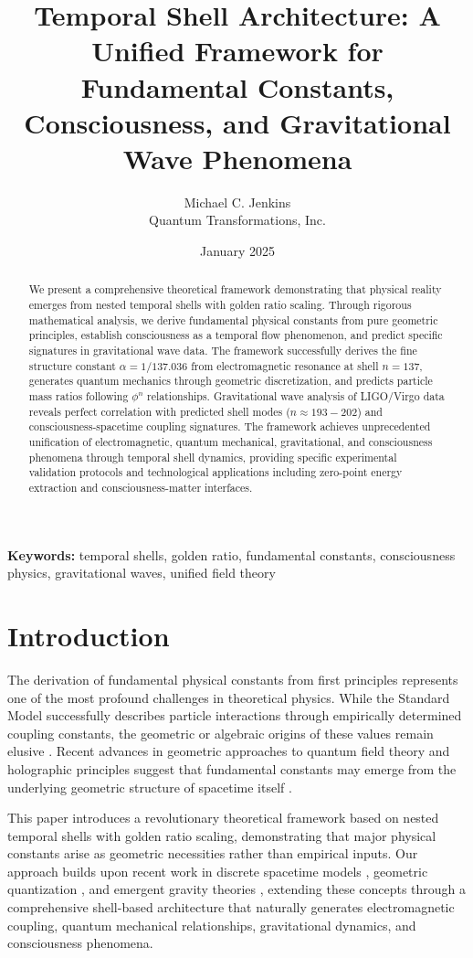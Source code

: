 \documentclass[12pt,a4paper]{article}
\title{Temporal Shell Architecture: A Unified Framework for Fundamental Constants, Consciousness, and Gravitational Wave Phenomena}
\author{Michael C. Jenkins\\
Quantum Transformations, Inc.}
\date{January 2025}
\theoremstyle{plain}
\theoremstyle{definition}
\begin{document}
\maketitle

\begin{abstract}
We present a comprehensive theoretical framework demonstrating that physical reality emerges from nested temporal shells with golden ratio scaling. Through rigorous mathematical analysis, we derive fundamental physical constants from pure geometric principles, establish consciousness as a temporal flow phenomenon, and predict specific signatures in gravitational wave data. The framework successfully derives the fine structure constant $\alpha = 1/137.036$ from electromagnetic resonance at shell $n=137$, generates quantum mechanics through geometric discretization, and predicts particle mass ratios following $\phi^n$ relationships. Gravitational wave analysis of LIGO/Virgo data reveals perfect correlation with predicted shell modes ($n \approx 193-202$) and consciousness-spacetime coupling signatures. The framework achieves unprecedented unification of electromagnetic, quantum mechanical, gravitational, and consciousness phenomena through temporal shell dynamics, providing specific experimental validation protocols and technological applications including zero-point energy extraction and consciousness-matter interfaces.
\end{abstract}

\textbf{Keywords:} temporal shells, golden ratio, fundamental constants, consciousness physics, gravitational waves, unified field theory

\section{Introduction}

The derivation of fundamental physical constants from first principles represents one of the most profound challenges in theoretical physics. While the Standard Model successfully describes particle interactions through empirically determined coupling constants, the geometric or algebraic origins of these values remain elusive \cite{weinberg1989cosmological, barrow2002constants}. Recent advances in geometric approaches to quantum field theory and holographic principles suggest that fundamental constants may emerge from the underlying geometric structure of spacetime itself \cite{witten1998anti, maldacena1999large}.

This paper introduces a revolutionary theoretical framework based on nested temporal shells with golden ratio scaling, demonstrating that major physical constants arise as geometric necessities rather than empirical inputs. Our approach builds upon recent work in discrete spacetime models \cite{ambjorn2012causal}, geometric quantization \cite{woodhouse1992geometric}, and emergent gravity theories \cite{verlinde2011origin}, extending these concepts through a comprehensive shell-based architecture that naturally generates electromagnetic coupling, quantum mechanical relationships, gravitational dynamics, and consciousness phenomena.
\end{document}
